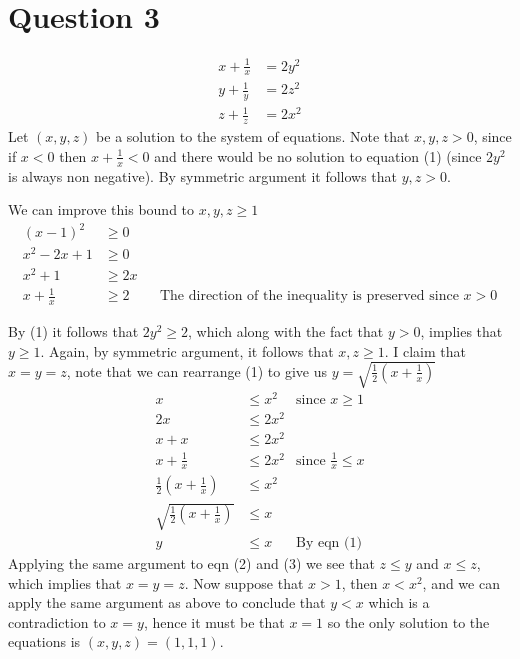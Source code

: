 \documentclass[11pt]{article}
\begin{document}
\section*{Question 3}
\begin{align}
	x+\frac{1}{x}&=2y^2 \\
	y+\frac{1}{y}&=2z^2 \\
	z+\frac{1}{z}&=2x^2
\end{align}
Let $(x,y,z)$ be a solution to the system of equations. Note that $x,y,z>0$, since if $x<0$ then $x+\frac{1}{x}<0$ and there would be no solution to equation (1) (since $2y^2$ is always non negative). By symmetric argument it follows that $y,z>0$.

We can improve this bound to $x,y,z\geq 1$
\begin{align*}
	(x-1)^2&\geq 0 \\
	x^2-2x+1&\geq 0 \\
	x^2+1&\geq 2x \\
	x + \frac{1}{x} &\geq 2 && \text{The direction of the inequality is preserved since $x>0$}
\end{align*}

By (1) it follows that $2y^2\geq 2$, which along with the fact that $y>0$, implies that $y\geq 1$. Again, by symmetric argument, it follows that $x,z\geq 1$. I claim that $x=y=z$, note that we can rearrange (1) to give us $y=\sqrt{\frac{1}{2}\left( x+\frac{1}{x}\right)}$
\begin{align*}
	x&\leq x^2 & \text{since $x\geq 1$} \\
	2x&\leq 2x^2 \\
	x+x&\leq 2x^2 \\
	x+\frac{1}{x}&\leq 2x^2  & \text{since $\frac{1}{x}\leq x$} \\
	\frac{1}{2}\left( x+\frac{1}{x}\right) &\leq x^2 \\
	\sqrt{\frac{1}{2}\left( x+\frac{1}{x}\right)} &\leq x \\
	y&\leq x & \text{By eqn (1)}
\end{align*}
Applying the same argument to eqn (2) and (3) we see that $z\leq y$ and $x\leq z$, which implies that $x=y=z$. Now suppose that $x>1$, then $x<x^2$, and we can apply the same argument as above to conclude that $y<x$ which is a contradiction to $x=y$, hence it must be that $x=1$ so the only solution to the equations is $(x,y,z)=(1,1,1)$.
\end{document}
